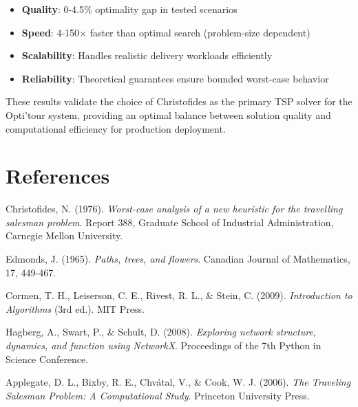 \documentclass[9pt,a4paper,twoside]{tau}
\begin{document}
\begin{itemize}
    \item \textbf{Quality}: 0-4.5\% optimality gap in tested scenarios
    \item \textbf{Speed}: 4-150$\times$ faster than optimal search (problem-size dependent)
    \item \textbf{Scalability}: Handles realistic delivery workloads efficiently
    \item \textbf{Reliability}: Theoretical guarantees ensure bounded worst-case behavior
\end{itemize}

These results validate the choice of Christofides as the primary TSP solver for the Opti'tour system, providing an optimal balance between solution quality and computational efficiency for production deployment.


\section{References}

\begin{thebibliography}{9}

Christofides, N. (1976).
\textit{Worst-case analysis of a new heuristic for the travelling salesman problem}.
Report 388, Graduate School of Industrial Administration, Carnegie Mellon University.

Edmonds, J. (1965).
\textit{Paths, trees, and flowers}.
Canadian Journal of Mathematics, 17, 449-467.

Cormen, T. H., Leiserson, C. E., Rivest, R. L., \& Stein, C. (2009).
\textit{Introduction to Algorithms} (3rd ed.).
MIT Press.

Hagberg, A., Swart, P., \& Schult, D. (2008).
\textit{Exploring network structure, dynamics, and function using NetworkX}.
Proceedings of the 7th Python in Science Conference.

Applegate, D. L., Bixby, R. E., Chvátal, V., \& Cook, W. J. (2006).
\textit{The Traveling Salesman Problem: A Computational Study}.
Princeton University Press.

\end{thebibliography}

\end{document}
